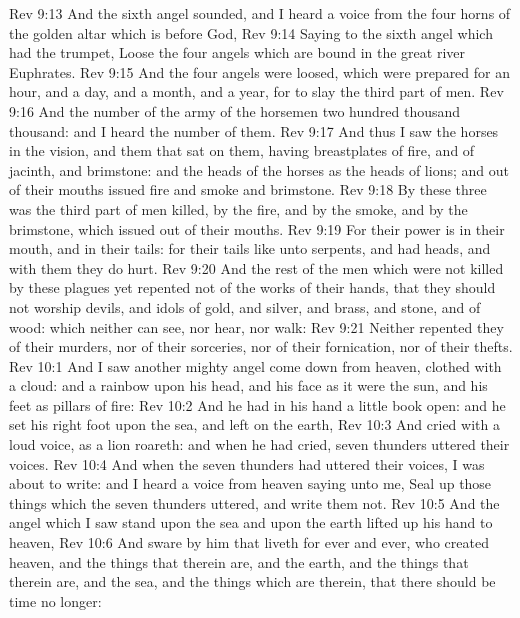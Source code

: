 \vs Rev 9:13 And the sixth angel sounded, and I heard a voice from the four horns of the golden altar which is before God,
\vs Rev 9:14 Saying to the sixth angel which had the trumpet, Loose the four angels which are bound in the great river Euphrates.
\vs Rev 9:15 And the four angels were loosed, which were prepared for an hour, and a day, and a month, and a year, for to slay the third part of men.
\vs Rev 9:16 And the number of the army of the horsemen  two hundred thousand thousand: and I heard the number of them.
\vs Rev 9:17 And thus I saw the horses in the vision, and them that sat on them, having breastplates of fire, and of jacinth, and brimstone: and the heads of the horses  as the heads of lions; and out of their mouths issued fire and smoke and brimstone.
\vs Rev 9:18 By these three was the third part of men killed, by the fire, and by the smoke, and by the brimstone, which issued out of their mouths.
\vs Rev 9:19 For their power is in their mouth, and in their tails: for their tails  like unto serpents, and had heads, and with them they do hurt.
\vs Rev 9:20 And the rest of the men which were not killed by these plagues yet repented not of the works of their hands, that they should not worship devils, and idols of gold, and silver, and brass, and stone, and of wood: which neither can see, nor hear, nor walk:
\vs Rev 9:21 Neither repented they of their murders, nor of their sorceries, nor of their fornication, nor of their thefts.
\vs Rev 10:1 And I saw another mighty angel come down from heaven, clothed with a cloud: and a rainbow  upon his head, and his face  as it were the sun, and his feet as pillars of fire:
\vs Rev 10:2 And he had in his hand a little book open: and he set his right foot upon the sea, and  left  on the earth,
\vs Rev 10:3 And cried with a loud voice, as  a lion roareth: and when he had cried, seven thunders uttered their voices.
\vs Rev 10:4 And when the seven thunders had uttered their voices, I was about to write: and I heard a voice from heaven saying unto me, Seal up those things which the seven thunders uttered, and write them not.
\vs Rev 10:5 And the angel which I saw stand upon the sea and upon the earth lifted up his hand to heaven,
\vs Rev 10:6 And sware by him that liveth for ever and ever, who created heaven, and the things that therein are, and the earth, and the things that therein are, and the sea, and the things which are therein, that there should be time no longer:
